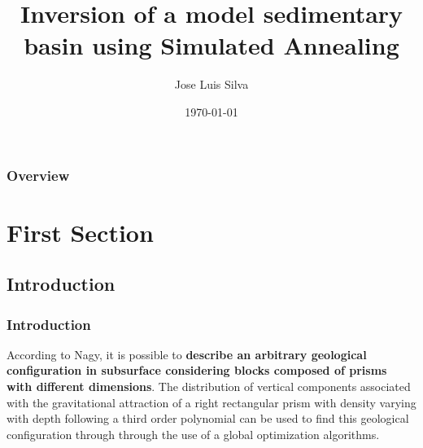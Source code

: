 \documentclass{beamer}
\title[Short title]{Inversion of a model sedimentary basin using Simulated Annealing} %
\author{Jose Luis Silva} %
\institute[UU] %
{
Uppsala University \\ %
\medskip
\textit{jose.silva@physics.uu.se} %
}
\date{\today} %
\begin{document}
\begin{frame}
\titlepage %
\end{frame}

\begin{frame}
\frametitle{Overview} %
\tableofcontents %
\end{frame}


\section{First Section} %

\subsection{Introduction} %

\begin{frame}
\frametitle{Introduction}
According to Nagy, it is possible to \textbf{describe an arbitrary geological configuration in subsurface considering blocks composed of prisms with different dimensions}. 
\newline \newline
The distribution of vertical components associated with the gravitational attraction of a right rectangular prism with density varying with depth following a third order polynomial can be used to find this geological configuration through through the use of a global optimization algorithms.
\end{frame}
\end{document}
